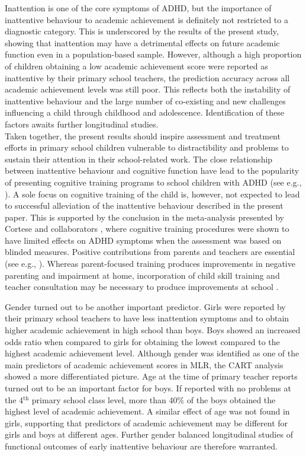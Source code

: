 \documentclass[10pt,letterpaper]{article}
\begin{document}
Inattention is one of the core symptoms of ADHD, but the importance of inattentive behaviour to academic achievement is definitely not restricted to a diagnostic category. This is underscored by the results of the present study, showing that inattention may have a detrimental effects on future academic function even in a population-based sample.  However, although a high proportion of children obtaining a low academic achievement score were reported as inattentive by their primary school teachers, the prediction accuracy across all academic achievement levels was still poor. This reflects both the instability of inattentive behaviour and the large number of co-existing and new challenges influencing a child through childhood and adolescence. Identification of these factors awaits further longitudinal studies. \\

Taken together, the present results should inspire assessment and treatment efforts in primary school children vulnerable to distractibility and problems to sustain their attention in their school-related work. 
The close relationship between inattentive behaviour and cognitive function \cite{Berger2013, Berger2015} have lead to the popularity of presenting cognitive training programs to school children with ADHD (see e.g., \cite{Rapport2013, Tamm2017}). A sole focus on cognitive training of the child is, however, not expected to lead to successful alleviation of the inattentive behaviour described in the present paper. This is supported by the  conclusion in the meta-analysis presented by Cortese and collaborators  \cite{Cortese2015}, where cognitive training procedures were shown to have limited effects on ADHD symptoms when the assessment was based on blinded measures. Positive contributions from parents and teachers are essential (see e.g., \cite{Pfiffner2014}). Whereas parent-focused training produces improvements in negative parenting and impairment at home, incorporation of child skill training and teacher consultation may be necessary to produce improvements at school \cite{Haack2016}. 

Gender turned out to be another important predictor. Girls were reported by their primary school teachers to have less inattention symptoms and to obtain higher academic achievement in high school than boys. Boys showed an increased odds ratio when compared to girls for obtaining the lowest compared to the highest academic achievement level. Although gender was identified as one of the main predictors of academic achievement scores in MLR, the CART analysis showed a more differentiated picture. Age at the time of primary teacher reports turned out to be an important factor for boys. If reported with no problems at the 4$^{\text{th}}$ primary school class level, more than 40\% of the boys obtained  the highest level of academic achievement. A similar effect of age was not found in girls, supporting that predictors of academic achievement may be different for girls and boys at different ages.  Further gender balanced longitudinal studies of functional outcomes of early inattentive behaviour are therefore warranted. \\
\end{document}
